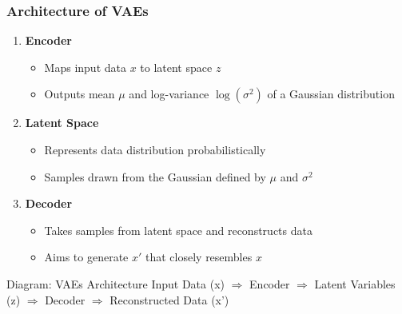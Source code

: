 \documentclass[aspectratio=169]{beamer}
\begin{document}
\begin{frame}[fragile]
    \frametitle{Architecture of VAEs}
    \begin{enumerate}
        \item \textbf{Encoder}
        \begin{itemize}
            \item Maps input data \(x\) to latent space \(z\) 
            \item Outputs mean \(\mu\) and log-variance \(\log(\sigma^2)\) of a Gaussian distribution
        \end{itemize}
        
        \item \textbf{Latent Space}
        \begin{itemize}
            \item Represents data distribution probabilistically
            \item Samples drawn from the Gaussian defined by \(\mu\) and \(\sigma^2\)
        \end{itemize}
        
        \item \textbf{Decoder}
        \begin{itemize}
            \item Takes samples from latent space and reconstructs data
            \item Aims to generate \(x'\) that closely resembles \(x\)
        \end{itemize}
    \end{enumerate}
    \begin{block}{Diagram: VAEs Architecture}
        \centering
        Input Data (x) $\Rightarrow$ Encoder $\Rightarrow$ Latent Variables (z) $\Rightarrow$ Decoder $\Rightarrow$ Reconstructed Data (x')
    \end{block}
\end{frame}
\end{document}

